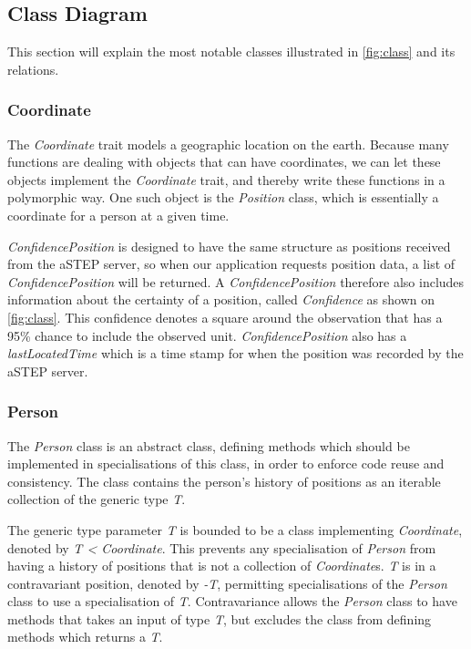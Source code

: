 \subsection{Class Diagram}
This section will explain the most notable classes illustrated in \cref{fig:class} and its relations.

\subsubsection{Coordinate}
The \emph{Coordinate} trait models a geographic location on the earth. Because many functions are dealing with objects that can have coordinates, we can let these objects implement the \emph{Coordinate} trait, and thereby write these functions in a polymorphic way. One such object is the \emph{Position} class, which is essentially a coordinate for a person at a given time.

\emph{ConfidencePosition} is designed to have the same structure as positions received from the aSTEP server, so when our application requests position data, a list of \emph{ConfidencePosition} will be returned. A \emph{ConfidencePosition} therefore also includes information about the certainty of a position, called \emph{Confidence} as shown on \cref{fig:class}. This confidence denotes a square around the observation that has a 95\% chance to include the observed unit\cite{cisco}. \emph{ConfidencePosition} also has a \emph{lastLocatedTime} which is a time stamp for when the position was recorded by the aSTEP server.

\subsubsection{Person}
The \emph{Person} class is an abstract class, defining methods which should be implemented in specialisations of this class, in order to enforce code reuse and consistency. The class contains the person's history of positions as an iterable collection of the generic type \emph{T}. 

The generic type parameter \emph{T} is bounded to be a class implementing \emph{Coordinate}, denoted by \emph{T < Coordinate}. This prevents any specialisation of \emph{Person} from having a history of positions that is not a collection of \emph{Coordinate}s. \emph{T} is in a contravariant position, denoted by \emph{-T}, permitting specialisations of the \emph{Person} class to use a specialisation of \emph{T}. Contravariance allows the \emph{Person} class to have methods that takes an input of type \emph{T}, but excludes the class from defining methods which returns a \emph{T}. 


